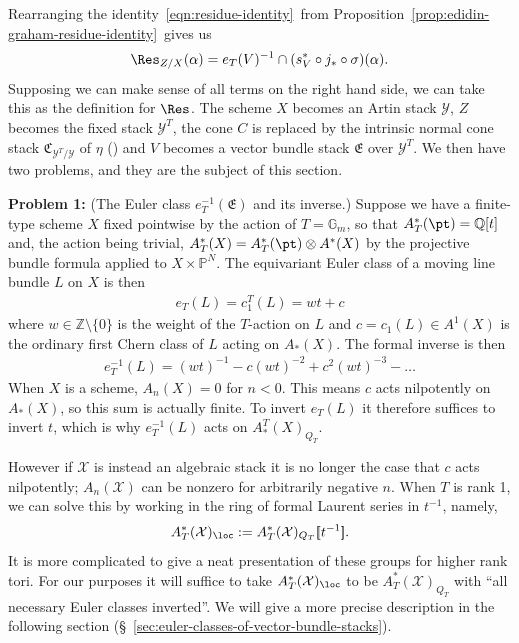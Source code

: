 \documentclass[12pt,dvipsnames]{amsart}
\begin{document}
Rearranging the identity~\ref{eqn:residue-identity}~from Proposition~\ref{prop:edidin-graham-residue-identity}~gives us
\begin{equation}\label{eqn:residue-identity-with-residue-isolated}
  \Res_{Z/X}(\alpha) = e_T(V)^{-1}\cap (s^*_V\circ j_*\circ \sigma)(\alpha).
\end{equation}
Supposing we can make sense of all terms on the right hand side, we can take this as the definition for \(\Res\). The scheme \(X\) becomes an Artin stack \(\mathcal Y\), \(Z\) becomes the fixed stack \(\mathcal Y^T\), the cone \(C\) is replaced by the intrinsic normal cone stack \(\mathfrak C_{\mathcal Y^T/\mathcal Y}\) of \(\eta\) (\cite[Definition 2.30]{manolache_VirtualPullbacks2012}) and \(V\) becomes a vector bundle stack \(\mathfrak E\) over \(\mathcal Y^T\). We then have two problems, and they are the subject of this section.

\bigskip

\noindent\textbf{Problem 1:} (The Euler class \(e^{-1}_T(\mathfrak E)\) and its inverse.) Suppose we have a finite-type scheme \(X\) fixed pointwise by the action of \(T = \mathbb G_m\), so that \(A^*_T(\pt) = \mathbb Q[t]\) and, the action being trivial, \(A^*_T(X) = A^*_T(\pt)\otimes A^*(X)\) by the projective bundle formula applied to \(X\times \mathbb P^N\). The equivariant Euler class of a moving line bundle \(L\) on \(X\) is then
\begin{align*}
  e_T(L) = c_1^T(L) = wt + c
\end{align*}
where \(w\in \mathbb Z\setminus\{0\}\) is the weight of the \(T\)-action on \(L\) and \(c = c_1(L)\in A^1(X)\) is the ordinary first Chern class of \(L\) acting on \(A_*(X)\). The formal inverse is then
\begin{align*}
  e_T^{-1}(L) = (wt)^{-1} - c(wt)^{-2} + c^2(wt)^{-3} - \dots
\end{align*}
When \(X\) is a scheme, \(A_n(X) = 0\) for \(n < 0\). This means \(c\) acts nilpotently on \(A_*(X)\), so this sum is actually finite. To invert \(e_T(L)\) it therefore suffices to invert \(t\), which is why \(e^{-1}_T(L)\) acts on \(A^T_*(X)_{Q_T}\).

However if \(\mathcal X\) is instead an algebraic stack it is no longer the case that \(c\) acts nilpotently; \(A_n(\mathcal X)\) can be nonzero for arbitrarily negative \(n\). When \(T\) is rank 1, we can solve this by working in the ring of formal Laurent series in \(t^{-1}\), namely,
\[A^*_T(\mathcal X)_{\loc} := A^*_T(\mathcal X)_{Q_T}[\hspace{-2pt}[t^{-1}]\hspace{-2.5pt}].\]
It is more complicated to give a neat presentation of these groups for higher rank tori. For our purposes it will suffice to take \( A^*_T(\mathcal X)_{\loc}\) to be \(A^*_T(\mathcal X)_{Q_T}\) with ``all necessary Euler classes inverted''. We will give a more precise description in the following section (\S~\ref{sec:euler-classes-of-vector-bundle-stacks}).
\end{document}
